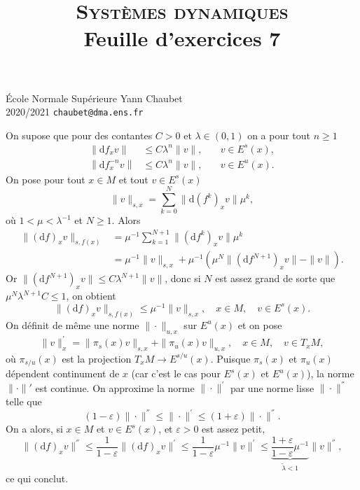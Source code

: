 \documentclass[a4paper,12pt,openany]{article}
\title{\textsc{Syst\`emes dynamiques} \\ Feuille d'exercices 7}
\date{}
\author{}
\theoremstyle{plain}
\theoremstyle{definition}
\newcommand{\dd}{\mathrm{d}}
\begin{document}
{\noindent \'Ecole Normale Sup\'erieure  \hfill Yann Chaubet } \\
{2020/2021 \hfill \texttt{chaubet@dma.ens.fr}}

{\let\newpage\relax\maketitle}
\maketitle

 \vspace{1.5mm} 

On supose que pour des contantes $C > 0$ et $\lambda \in (0, 1)$ on a pour tout $n \geqslant 1$
$$
\begin{aligned}
\left \|\dd f_x v \right\| &\leqslant C\lambda^n \| v \|, \quad &v \in E^s(x), \\
\left \|\dd f^{-n}_x v \right\| &\leqslant C\lambda^n \| v \|, \quad &v \in E^u(x).
\end{aligned}
$$
On pose pour tout $x \in M$ et tout $v \in E^s(x)$
$$
\|v\|_{s,x} = \sum_{k = 0}^N \|\dd (f^k)_x  v\| \mu^k,
$$
o\`u $1 < \mu < \lambda^{-1}$ et $N \geqslant 1$.
Alors
$$
\begin{aligned}
\| (\dd f)_x v\|_{s, f(x)} &= \mu^{-1} \sum_{k=1}^{N+1} \|(\dd f^k)_xv\| \mu^{k} \\
&= \mu^{-1} \|v\|_{s,x} + \mu^{-1}\left(\mu^N\|(\dd f^{N+1})_xv\| -\|v\|\right).
\end{aligned}
$$
Or 
$
\|(\dd f^{N+1})_x v\| \leq C \lambda^{N+1} \| v \|$, donc si $N$ est assez grand de sorte que $\mu^N \lambda^{N+1} C \leqslant 1$, on obtient
$$
\| (\dd f)_x v\|_{s, f(x)} \leqslant \mu^{-1} \|v\|_{s,x}, \quad x \in M, \quad v \in E^s(x).
$$
On d\'efinit de m\^eme une norme $\|\cdot\|_{u,x}$ sur $E^u(x)$ et on pose
$$
\|v\|^{'}_x = \|\pi_s(x)v\|_{s,x} + \|\pi_u(x)v\|_{u,x}, \quad x \in M, \quad v \in T_xM,
$$
o\`u $\pi_{s/u}(x)$ est la projection $T_xM \to E^{s/u}(x)$. Puisque $\pi_s(x)$ et $\pi_u(x)$ d\'ependent continument de $x$ (car c'est le cas pour $E^s(x)$ et $E^u(x)$), la norme $\|\cdot\|'$ est continue. On approxime la norme $\|\cdot\|^{'}$ par une norme lisse $\|\cdot\|^{''}$ telle que 
$$(1- \varepsilon) \|\cdot\|^{''} \leq \| \cdot \|^{'} \leq (1+\varepsilon)\|\cdot\|^{''}.$$
On a alors, si $x \in M$ et $v \in E^s(x)$, et $\varepsilon > 0$ est assez petit,
$$\|(\dd f)_xv\|^{''} \leqslant \frac{1}{1-\varepsilon} \|(\dd f)_xv\|^{'} \leqslant \frac{1}{1-\varepsilon} \mu^{-1} \|v\|^{'} \leqslant \underset{\displaystyle{ \tilde\lambda < 1}}{\underbrace{\frac{1 + \varepsilon}{1-\varepsilon}\mu^{-1}}} \|v\|^{''},$$
ce qui conclut.
\vspace{0.6cm}
\end{document}

